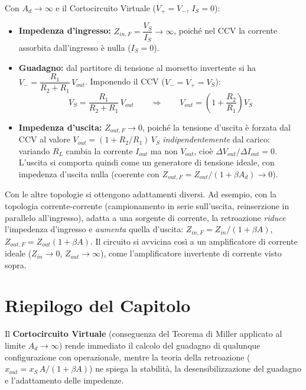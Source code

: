 \noindent
Con $A_d \to \infty$ e il Cortocircuito Virtuale ($V_+ = V_-$, $I_S = 0$):

\begin{itemize}[noitemsep, leftmargin=*]
    \item \textbf{Impedenza d'ingresso:} $Z_{in,F} = \dfrac{V_S}{I_S} \to \infty$, poiché nel CCV la corrente assorbita dall'ingresso è nulla ($I_S = 0$).
    
    \item \textbf{Guadagno:} dal partitore di tensione al morsetto invertente si ha $V_- = \dfrac{R_1}{R_2 + R_1}\,V_{out}$. Imponendo il CCV ($V_- = V_+ = V_S$):
    \[
        V_S = \frac{R_1}{R_2 + R_1}\,V_{out} \qquad \Longrightarrow \qquad V_{out} = \left(1 + \frac{R_2}{R_1}\right) V_S
    \]
    
    \item \textbf{Impedenza d'uscita:} $Z_{out,F} \to 0$, poiché la tensione d'uscita è forzata dal CCV al valore $V_{out} = (1 + R_2/R_1)\,V_S$ \emph{indipendentemente} dal carico: variando $R_L$ cambia la corrente $I_{out}$ ma non $V_{out}$, cioè $\Delta V_{out}/\Delta I_{out} = 0$. L'uscita si comporta quindi come un generatore di tensione ideale, con impedenza d'uscita nulla (coerente con $Z_{out,F} = Z_{out}/(1+\beta A_d) \to 0$).
\end{itemize}

\medskip
\noindent
\begin{note}Con le altre topologie si ottengono adattamenti diversi. Ad esempio, con la topologia corrente-corrente (campionamento in serie sull'uscita, reinserzione in parallelo all'ingresso), adatta a una sorgente di corrente, la retroazione \emph{riduce} l'impedenza d'ingresso e \emph{aumenta} quella d'uscita: $Z_{in,F} = Z_{in}/(1+\beta A)$, $Z_{out,F} = Z_{out}(1+\beta A)$. Il circuito si avvicina così a un amplificatore di corrente ideale ($Z_{in} \to 0$, $Z_{out} \to \infty$), come l'amplificatore invertente di corrente visto sopra.\end{note}

\section*{Riepilogo del Capitolo}

\begin{important}
Il \textbf{Cortocircuito Virtuale} (conseguenza del Teorema di Miller applicato al limite $A_d \to \infty$) rende immediato il calcolo del guadagno di qualunque configurazione con operazionale, mentre la teoria della retroazione ($x_{out} = x_S \, A/(1+\beta A)$) ne spiega la stabilità, la desensibilizzazione del guadagno e l'adattamento delle impedenze.
\end{important}

